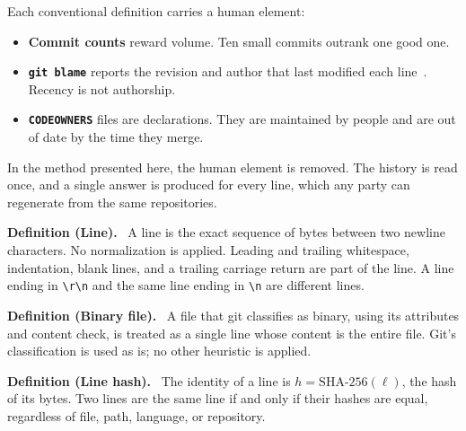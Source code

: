 \documentclass[11pt,a4paper]{article}
\makeatletter
\renewcommand\section{\@startsection{section}{1}{\z@}{-2.2ex plus -0.5ex}{1ex}{\sffamily\large\bfseries\color{brand}}}
\newenvironment{definition}[1]{\par\smallskip\noindent\textbf{Definition (#1).}\ }{\par\smallskip}
\makeatother
\begin{document}
Each conventional definition carries a human element:

\begin{itemize}\setlength{\itemsep}{0.2em}
  \item \textbf{Commit counts} reward volume. Ten small commits outrank one good one.
  \item \textbf{\texttt{git blame}} reports the revision and author that last
    modified each line~\cite{blame}. Recency is not authorship.
  \item \textbf{\texttt{CODEOWNERS}} files are declarations. They are maintained
    by people and are out of date by the time they merge.
\end{itemize}

In the method presented here, the human element is removed. The history is
read once, and a single answer is produced for every line, which any party can
regenerate from the same repositories.

\section{Definitions}

\begin{definition}{Line}
A line is the exact sequence of bytes between two newline characters. No
normalization is applied. Leading and trailing whitespace, indentation, blank
lines, and a trailing carriage return are part of the line. A line ending in
\verb|\r\n| and the same line ending in \verb|\n| are different lines.
\end{definition}

\begin{definition}{Binary file}
A file that git classifies as binary, using its attributes and content check,
is treated as a single line whose content is the entire file. Git's
classification is used as is; no other heuristic is applied.
\end{definition}

\begin{definition}{Line hash}
The identity of a line is $h = \mathrm{SHA\text{-}256}(\ell)$, the hash of its
bytes. Two lines are the same line if and only if their hashes are equal,
regardless of file, path, language, or repository.
\end{definition}
\end{document}
